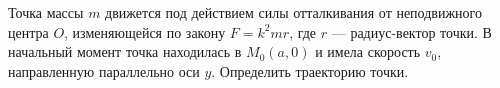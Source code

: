 Точка массы $m$ движется под действием силы отталкивания от неподвижного центра $O$, изменяющейся по закону $F=k^2mr$,
где $r$ --- радиус-вектор точки. В начальный момент точка находилась в $M_{0}(a,0)$ и имела скорость $v_{0}$,
направленную параллельно оси $y$. Определить траекторию точки.
